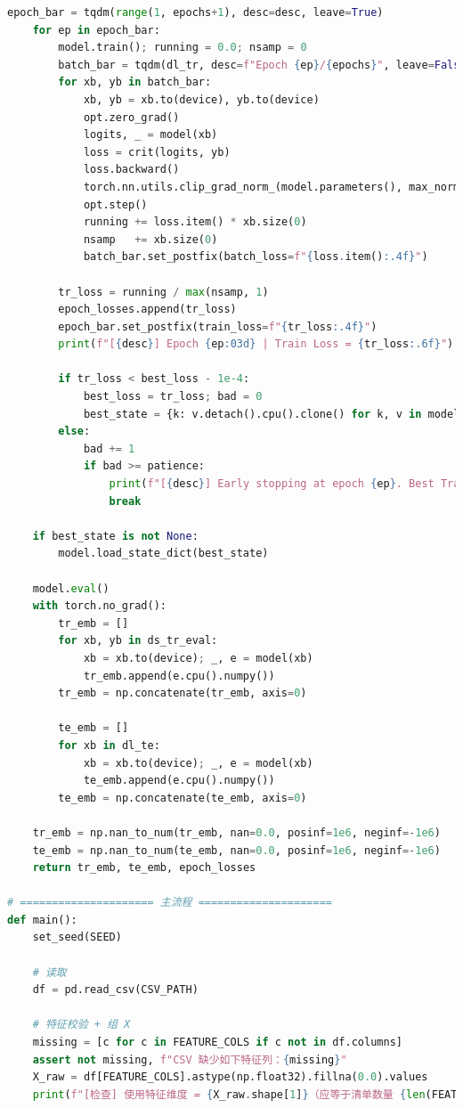 \documentclass[a4paper]{CPIPC}
\numberwithin{equation}{section}
\begin{document}
\begin{lstlisting}[language=Python, caption=CNN + SVM Classifier]
    epoch_bar = tqdm(range(1, epochs+1), desc=desc, leave=True)
    for ep in epoch_bar:
        model.train(); running = 0.0; nsamp = 0
        batch_bar = tqdm(dl_tr, desc=f"Epoch {ep}/{epochs}", leave=False)
        for xb, yb in batch_bar:
            xb, yb = xb.to(device), yb.to(device)
            opt.zero_grad()
            logits, _ = model(xb)
            loss = crit(logits, yb)
            loss.backward()
            torch.nn.utils.clip_grad_norm_(model.parameters(), max_norm=5.0)
            opt.step()
            running += loss.item() * xb.size(0)
            nsamp   += xb.size(0)
            batch_bar.set_postfix(batch_loss=f"{loss.item():.4f}")

        tr_loss = running / max(nsamp, 1)
        epoch_losses.append(tr_loss)
        epoch_bar.set_postfix(train_loss=f"{tr_loss:.4f}")
        print(f"[{desc}] Epoch {ep:03d} | Train Loss = {tr_loss:.6f}")

        if tr_loss < best_loss - 1e-4:
            best_loss = tr_loss; bad = 0
            best_state = {k: v.detach().cpu().clone() for k, v in model.state_dict().items()}
        else:
            bad += 1
            if bad >= patience:
                print(f"[{desc}] Early stopping at epoch {ep}. Best Train Loss={best_loss:.6f}")
                break

    if best_state is not None:
        model.load_state_dict(best_state)

    model.eval()
    with torch.no_grad():
        tr_emb = []
        for xb, yb in ds_tr_eval:
            xb = xb.to(device); _, e = model(xb)
            tr_emb.append(e.cpu().numpy())
        tr_emb = np.concatenate(tr_emb, axis=0)

        te_emb = []
        for xb in dl_te:
            xb = xb.to(device); _, e = model(xb)
            te_emb.append(e.cpu().numpy())
        te_emb = np.concatenate(te_emb, axis=0)

    tr_emb = np.nan_to_num(tr_emb, nan=0.0, posinf=1e6, neginf=-1e6)
    te_emb = np.nan_to_num(te_emb, nan=0.0, posinf=1e6, neginf=-1e6)
    return tr_emb, te_emb, epoch_losses

# ===================== 主流程 =====================
def main():
    set_seed(SEED)

    # 读取
    df = pd.read_csv(CSV_PATH)

    # 特征校验 + 组 X
    missing = [c for c in FEATURE_COLS if c not in df.columns]
    assert not missing, f"CSV 缺少如下特征列：{missing}"
    X_raw = df[FEATURE_COLS].astype(np.float32).fillna(0.0).values
    print(f"[检查] 使用特征维度 = {X_raw.shape[1]}（应等于清单数量 {len(FEATURE_COLS)}）")


\end{lstlisting}
\end{document}
